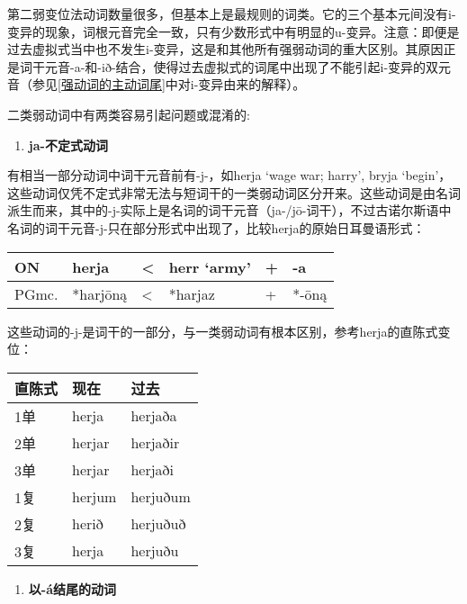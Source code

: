 第二弱变位法动词数量很多，但基本上是最规则的词类。它的三个基本元间没有i-变异的现象，词根元音完全一致，只有少数形式中有明显的u-变异。注意：即便是过去虚拟式当中也不发生i-变异，这是和其他所有强弱动词的重大区别。其原因正是词干元音-a-和-ið-结合，使得过去虚拟式的词尾中出现了不能引起i-变异的双元音（参见\ref{强动词的主动词尾}中对i-变异由来的解释）。

二类弱动词中有两类容易引起问题或混淆的:

\begin{enumerate}
  \def\labelenumi{\arabic{enumi})}
  \item
        \textbf{ja-不定式动词}
\end{enumerate}

有相当一部分动词中词干元音前有-j-，如herja `wage war; harry', bryja
`begin'，这些动词仅凭不定式非常无法与短词干的一类弱动词区分开来。这些动词是由名词派生而来，其中的-j-实际上是名词的词干元音（ja-/jō-词干），不过古诺尔斯语中名词的词干元音-j-只在部分形式中出现了，比较herja的原始日耳曼语形式：

\begin{longtable}{llllll}
  \toprule
  ON    & herja    & \textless{} & herr `army' & + & -a    \\
  \midrule
  \endhead
  \bottomrule
  \endfoot
  PGmc. & *harjōną & \textless{} & *harjaz     & + & *-ōną \\
\end{longtable}

这些动词的-j-是词干的一部分，与一类弱动词有根本区别，参考herja的直陈式变位：

\begin{longtable}{lll}
  \toprule
  直陈式 & 现在   & 过去     \\
  \midrule
  \endhead
  \bottomrule
  \endfoot
  1单    & herja  & herjaða  \\
  2单    & herjar & herjaðir \\
  3单    & herjar & herjaði  \\
  1复    & herjum & herjuðum \\
  2复    & herið  & herjuðuð \\
  3复    & herja  & herjuðu  \\
\end{longtable}

\begin{enumerate}
  \def\labelenumi{\arabic{enumi})}
  \setcounter{enumi}{1}
  \item
        \textbf{以-á结尾的动词}
\end{enumerate}

